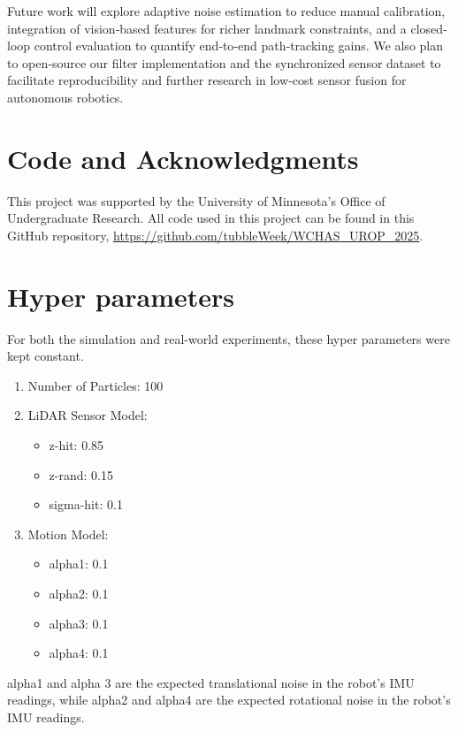 \documentclass[10.5pt]{article}
\begin{document}
Future work will explore adaptive noise estimation to reduce manual calibration, integration of vision‐based features for richer landmark constraints, and a closed‐loop control evaluation to quantify end‐to‐end path‐tracking gains.  We also plan to open‐source our filter implementation and the synchronized sensor dataset to facilitate reproducibility and further research in low‐cost sensor fusion for autonomous robotics.

\section{Code and Acknowledgments}
This project was supported by the University of Minnesota's Office of
Undergraduate Research. All code used in this project can be found in this GitHub repository, \url{https://github.com/tubbleWeek/WCHAS_UROP_2025}. 

\section{Hyper parameters}
For both the simulation and real-world experiments, these hyper parameters were kept constant.
\begin{enumerate}
    \item Number of Particles: 100
    \item LiDAR Sensor Model:
    \begin{itemize}
        \item z-hit: 0.85
        \item z-rand: 0.15
        \item sigma-hit: 0.1
    \end{itemize}
    \item Motion Model:
    \begin{itemize}
        \item alpha1: 0.1
        \item alpha2: 0.1
        \item alpha3: 0.1
        \item alpha4: 0.1
    \end{itemize}
\end{enumerate}
alpha1 and alpha 3 are the expected translational noise in the robot's IMU readings, while alpha2 and alpha4 are the expected rotational noise in the robot's IMU readings.


\end{document}
